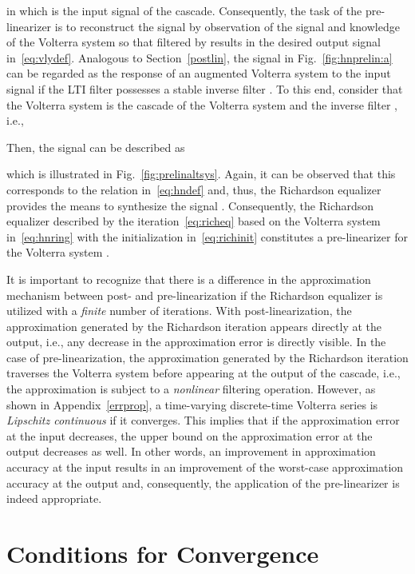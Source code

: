 \documentclass[10pt,twocolumn,twoside]{IEEEtran}
\begin{document}
in which  is the input signal of the cascade. Consequently, the task of the
pre-linearizer is to reconstruct the signal  by observation of the signal  and
knowledge of the Volterra system  so that  filtered by 
results in the desired output signal  in~\eqref{eq:vlydef}. Analogous to
Section~\ref{postlin}, the signal  in Fig.~\ref{fig:hnprelin:a} can be regarded
as the response of an augmented Volterra system  to the input signal 
if the LTI filter  possesses a stable inverse filter .
To this end, consider that the Volterra system  is the cascade of
the Volterra system  and the inverse filter , i.e.,

Then, the signal  can be described as

which is illustrated in Fig.~\ref{fig:prelinaltsys}.
Again, it can be observed that this corresponds to the
relation in~\eqref{eq:hndef} and, thus, the Richardson equalizer provides
the means to synthesize the signal . Consequently, the Richardson
equalizer described by the iteration~\eqref{eq:richeq} based on the Volterra
system  in~\eqref{eq:hnring} with the initialization in~\eqref{eq:richinit}
constitutes a pre-linearizer for the Volterra system .

It is important to recognize that there is a difference in the approximation
mechanism between post- and pre-linearization if the Richardson equalizer
is utilized with a \emph{finite} number of iterations. With post-linearization, the
approximation generated by the Richardson iteration appears directly at the
output, i.e., any decrease in the approximation error is directly visible.
In the case of pre-linearization, the approximation generated by the Richardson
iteration traverses the Volterra system  before appearing at the output
of the cascade, i.e., the approximation is subject to a \emph{nonlinear} filtering
operation. However, as shown in Appendix~\ref{errprop}, a time-varying discrete-time
Volterra series is \emph{Lipschitz continuous} if it converges.
This implies that if the approximation error at the input decreases, the upper
bound on the approximation error at the output decreases as well. In other words,
an improvement in approximation accuracy at the input results in an improvement of
the worst-case approximation accuracy at the output and, consequently, the
application of the pre-linearizer is indeed appropriate.


\section{Conditions for Convergence}
	\label{conv}
\end{document}

